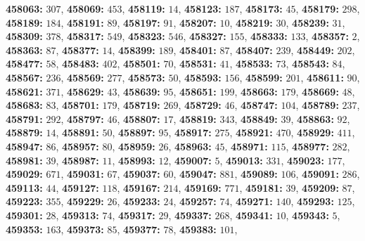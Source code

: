 \textsf{\bfseries 458063:} $307$, \textsf{\bfseries 458069:} $453$, \textsf{\bfseries 458119:} $14$, \textsf{\bfseries 458123:} $187$, \textsf{\bfseries 458173:} $45$, \textsf{\bfseries 458179:} $298$, \textsf{\bfseries 458189:} $184$, \textsf{\bfseries 458191:} $89$, \textsf{\bfseries 458197:} $91$, \textsf{\bfseries 458207:} $10$, \textsf{\bfseries 458219:} $30$, \textsf{\bfseries 458239:} $31$, \textsf{\bfseries 458309:} $378$, \textsf{\bfseries 458317:} $549$, \textsf{\bfseries 458323:} $546$, \textsf{\bfseries 458327:} $155$, \textsf{\bfseries 458333:} $133$, \textsf{\bfseries 458357:} $2$, \textsf{\bfseries 458363:} $87$, \textsf{\bfseries 458377:} $14$, \textsf{\bfseries 458399:} $189$, \textsf{\bfseries 458401:} $87$, \textsf{\bfseries 458407:} $239$, \textsf{\bfseries 458449:} $202$, \textsf{\bfseries 458477:} $58$, \textsf{\bfseries 458483:} $402$, \textsf{\bfseries 458501:} $70$, \textsf{\bfseries 458531:} $41$, \textsf{\bfseries 458533:} $73$, \textsf{\bfseries 458543:} $84$, \textsf{\bfseries 458567:} $236$, \textsf{\bfseries 458569:} $277$, \textsf{\bfseries 458573:} $50$, \textsf{\bfseries 458593:} $156$, \textsf{\bfseries 458599:} $201$, \textsf{\bfseries 458611:} $90$, \textsf{\bfseries 458621:} $371$, \textsf{\bfseries 458629:} $43$, \textsf{\bfseries 458639:} $95$, \textsf{\bfseries 458651:} $199$, \textsf{\bfseries 458663:} $179$, \textsf{\bfseries 458669:} $48$, \textsf{\bfseries 458683:} $83$, \textsf{\bfseries 458701:} $179$, \textsf{\bfseries 458719:} $269$, \textsf{\bfseries 458729:} $46$, \textsf{\bfseries 458747:} $104$, \textsf{\bfseries 458789:} $237$, \textsf{\bfseries 458791:} $292$, \textsf{\bfseries 458797:} $46$, \textsf{\bfseries 458807:} $17$, \textsf{\bfseries 458819:} $343$, \textsf{\bfseries 458849:} $39$, \textsf{\bfseries 458863:} $92$, \textsf{\bfseries 458879:} $14$, \textsf{\bfseries 458891:} $50$, \textsf{\bfseries 458897:} $95$, \textsf{\bfseries 458917:} $275$, \textsf{\bfseries 458921:} $470$, \textsf{\bfseries 458929:} $411$, \textsf{\bfseries 458947:} $86$, \textsf{\bfseries 458957:} $80$, \textsf{\bfseries 458959:} $26$, \textsf{\bfseries 458963:} $45$, \textsf{\bfseries 458971:} $115$, \textsf{\bfseries 458977:} $282$, \textsf{\bfseries 458981:} $39$, \textsf{\bfseries 458987:} $11$, \textsf{\bfseries 458993:} $12$, \textsf{\bfseries 459007:} $5$, \textsf{\bfseries 459013:} $331$, \textsf{\bfseries 459023:} $177$, \textsf{\bfseries 459029:} $671$, \textsf{\bfseries 459031:} $67$, \textsf{\bfseries 459037:} $60$, \textsf{\bfseries 459047:} $881$, \textsf{\bfseries 459089:} $106$, \textsf{\bfseries 459091:} $286$, \textsf{\bfseries 459113:} $44$, \textsf{\bfseries 459127:} $118$, \textsf{\bfseries 459167:} $214$, \textsf{\bfseries 459169:} $771$, \textsf{\bfseries 459181:} $39$, \textsf{\bfseries 459209:} $87$, \textsf{\bfseries 459223:} $355$, \textsf{\bfseries 459229:} $26$, \textsf{\bfseries 459233:} $24$, \textsf{\bfseries 459257:} $74$, \textsf{\bfseries 459271:} $140$, \textsf{\bfseries 459293:} $125$, \textsf{\bfseries 459301:} $28$, \textsf{\bfseries 459313:} $74$, \textsf{\bfseries 459317:} $29$, \textsf{\bfseries 459337:} $268$, \textsf{\bfseries 459341:} $10$, \textsf{\bfseries 459343:} $5$, \textsf{\bfseries 459353:} $163$, \textsf{\bfseries 459373:} $85$, \textsf{\bfseries 459377:} $78$, \textsf{\bfseries 459383:} $101$, 
